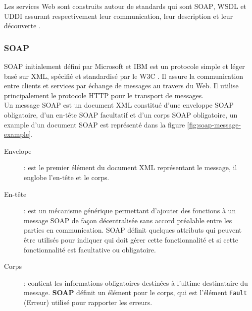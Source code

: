 	Les services Web sont construits autour de standards qui sont \textsc{SOAP}, \textsc{WSDL} et \textsc{UDDI} assurant respectivement leur
	communication, leur description et leur découverte .

	\newpage
	\subsubsection{SOAP}
		\textsc{SOAP} initialement défini par Microsoft et IBM \cite{box2000simple}
	       	est un protocole simple et léger basé sur \textsc{XML}, spécifié et standardisé par le \textsc{W3C}  
		\cite{mitra2003soap}. Il assure la communication entre clients et services par échange de messages au 
		travers du Web.  Il utilise principalement le protocole \textsc{HTTP} pour le transport de messages.\\

		Un message \textsc{SOAP} est un document XML constitué d'une enveloppe \textsc{SOAP} obligatoire, 
		d'un en-tête \textsc{SOAP} facultatif et d'un corps \textsc{SOAP} obligatoire, un example d'un 
		document \textsc{SOAP} est représenté dans la figure \ref{fig:soap-message-example}.

		

		\begin{figure}
		    \centering
		    
		\end{figure}

		
		\renewcommand{\descriptionlabel}[1]{\hspace{1cm}\textsf{#1}}
		\begin{description} %
		    \item[Envelope]:  
			est le premier élément du document XML représentant le message,
			il englobe l'en-tête et le corps.

		    \item[En-tête]:
		       	est un mécanisme générique permettant d'ajouter des fonctions à un message
			\textsc{SOAP} de façon décentralisée sans accord préalable entre les parties en communication. 
			\textsc{SOAP} définit quelques attributs qui peuvent être utilisés pour indiquer qui doit gérer 
			cette fonctionnalité et si cette fonctionnalité est facultative ou obligatoire. 

		    \item[Corps]: 
			contient les informations obligatoires destinées à l'ultime destinataire du message.
			\textbf{SOAP} définit un élément pour le corps, qui est l'élément \texttt{Fault} (Erreur) 
			utilisé pour rapporter les erreurs.
		\end{description}

